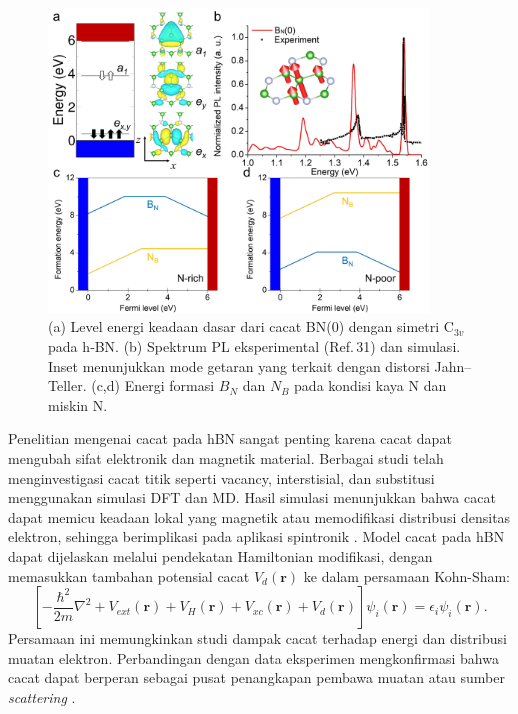 \begin{figure}[htbp]
  \centering
  \includegraphics[width=0.9\textwidth]{gambar/elektronik_hBN_antisite.jpg}
  \caption{(a) Level energi keadaan dasar dari cacat BN(0) dengan simetri $\mathrm{C}_{3v}$ pada h‑BN. 
    (b) Spektrum PL eksperimental (Ref.\,31) dan simulasi. Inset menunjukkan mode getaran yang terkait dengan distorsi Jahn–Teller. 
    (c,d) Energi formasi $B_N$ dan $N_B$ pada kondisi kaya N dan miskin N. \citep{song2025}}
  \label{fig:BN0_JT_formation_energy}
\end{figure}
Penelitian mengenai cacat pada hBN sangat penting karena cacat dapat mengubah sifat elektronik dan magnetik material.
Berbagai studi telah menginvestigasi cacat titik seperti vacancy, interstisial, dan substitusi menggunakan simulasi DFT dan MD.
Hasil simulasi menunjukkan bahwa cacat dapat memicu keadaan lokal yang magnetik atau memodifikasi distribusi densitas elektron, sehingga berimplikasi pada aplikasi spintronik \citep{Zhang2020}.
Model cacat pada hBN dapat dijelaskan melalui pendekatan Hamiltonian modifikasi, dengan memasukkan tambahan potensial cacat \(V_d(\mathbf{r})\) ke dalam persamaan Kohn-Sham:
\begin{equation}
    \left[-\frac{\hbar^2}{2m}\nabla^2 + V_{ext}(\mathbf{r}) + V_H(\mathbf{r}) + V_{xc}(\mathbf{r}) + V_d(\mathbf{r})\right]\psi_i(\mathbf{r}) = \epsilon_i \psi_i(\mathbf{r}).
\end{equation}
Persamaan ini memungkinkan studi dampak cacat terhadap energi dan distribusi muatan elektron.
Perbandingan dengan data eksperimen mengkonfirmasi bahwa cacat dapat berperan sebagai pusat penangkapan pembawa muatan atau sumber \emph{scattering} \citep{Zhang2020}.

